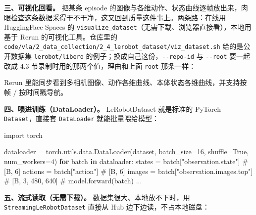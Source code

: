 \documentclass[
  chinese,
]{ctexart}
\newenvironment{Shaded}{\begin{snugshade}}{\end{snugshade}}
\newcommand{\AttributeTok}[1]{\textcolor[rgb]{0.40,0.45,0.13}{#1}}
\newcommand{\CommentTok}[1]{\textcolor[rgb]{0.37,0.37,0.37}{#1}}
\newcommand{\ControlFlowTok}[1]{\textcolor[rgb]{0.00,0.23,0.31}{\textbf{#1}}}
\newcommand{\DecValTok}[1]{\textcolor[rgb]{0.68,0.00,0.00}{#1}}
\newcommand{\ExtensionTok}[1]{\textcolor[rgb]{0.00,0.23,0.31}{#1}}
\newcommand{\ImportTok}[1]{\textcolor[rgb]{0.00,0.46,0.62}{#1}}
\newcommand{\KeywordTok}[1]{\textcolor[rgb]{0.00,0.23,0.31}{\textbf{#1}}}
\newcommand{\NormalTok}[1]{\textcolor[rgb]{0.00,0.23,0.31}{#1}}
\newcommand{\OperatorTok}[1]{\textcolor[rgb]{0.37,0.37,0.37}{#1}}
\newcommand{\StringTok}[1]{\textcolor[rgb]{0.13,0.47,0.30}{#1}}
\newcommand{\VariableTok}[1]{\textcolor[rgb]{0.07,0.07,0.07}{#1}}
\begin{document}
\textbf{三、可视化回看。} 把某条 episode
的图像与各维动作、状态曲线逐帧放出来，肉眼检查这条数据采得干不干净，这又回到质量这件事上。两条路：在线用
HuggingFace Spaces 的
\texttt{visualize\_dataset}（无需下载、浏览器直接看），本地用基于 Rerun
的可视化工具。仓库里的
\texttt{code/vla/2\_data\_collection/2\_4\_lerobot\_dataset/viz\_dataset.sh}
给的是公开数据集 \texttt{lerobot/libero}
的例子；换成自己这份，\texttt{-\/-repo-id} 与 \texttt{-\/-root}
要一起改成 4.3 节录制时用的那两个值，理由和上面 \texttt{root} 那条一样：

\begin{Shaded}
\end{Shaded}

Rerun 里能同步看到多相机图像、动作各维曲线、本体状态各维曲线，并支持按帧
/ 按时间戳导航。

\textbf{四、喂进训练（DataLoader）。} LeRobotDataset 就是标准的 PyTorch
\texttt{Dataset}，直接套 \texttt{DataLoader} 就能批量喂给模型：

\begin{Shaded}
\begin{Highlighting}[]
\ImportTok{import}\NormalTok{ torch}

\NormalTok{dataloader }\OperatorTok{=}\NormalTok{ torch.utils.data.DataLoader(dataset, batch\_size}\OperatorTok{=}\DecValTok{16}\NormalTok{, shuffle}\OperatorTok{=}\VariableTok{True}\NormalTok{, num\_workers}\OperatorTok{=}\DecValTok{4}\NormalTok{)}
\ControlFlowTok{for}\NormalTok{ batch }\KeywordTok{in}\NormalTok{ dataloader:}
\NormalTok{    states  }\OperatorTok{=}\NormalTok{ batch[}\StringTok{"observation.state"}\NormalTok{]          }\CommentTok{\# [B, 6]}
\NormalTok{    actions }\OperatorTok{=}\NormalTok{ batch[}\StringTok{"action"}\NormalTok{]                     }\CommentTok{\# [B, 6]}
\NormalTok{    images  }\OperatorTok{=}\NormalTok{ batch[}\StringTok{"observation.images.top"}\NormalTok{]     }\CommentTok{\# [B, 3, 480, 640]}
    \CommentTok{\# model.forward(batch) ...}
\end{Highlighting}
\end{Shaded}

\textbf{五、流式读取（无需下载）。} 数据集很大、本地放不下时，用
\texttt{StreamingLeRobotDataset} 直接从 Hub 边下边读，不占本地磁盘：
\end{document}
